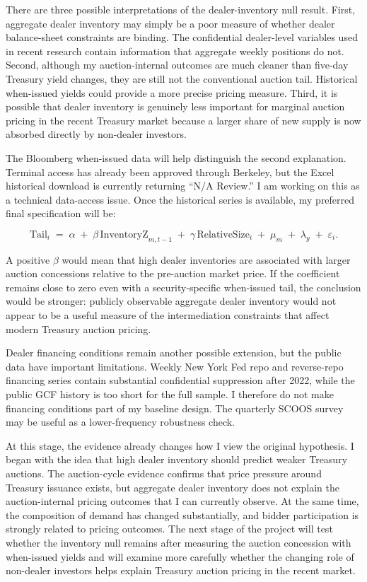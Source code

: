\documentclass[12pt]{article}
\begin{document}
There are three possible interpretations of the dealer-inventory null result. First, aggregate dealer inventory may simply be a poor measure of whether dealer balance-sheet constraints are binding. The confidential dealer-level variables used in recent research contain information that aggregate weekly positions do not. Second, although my auction-internal outcomes are much cleaner than five-day Treasury yield changes, they are still not the conventional auction tail. Historical when-issued yields could provide a more precise pricing measure. Third, it is possible that dealer inventory is genuinely less important for marginal auction pricing in the recent Treasury market because a larger share of new supply is now absorbed directly by non-dealer investors.

The Bloomberg when-issued data will help distinguish the second explanation. Terminal access has already been approved through Berkeley, but the Excel historical download is currently returning ``N/A Review.'' I am working on this as a technical data-access issue. Once the historical series is available, my preferred final specification will be:

\begin{equation*}
\text{Tail}_i \;=\; \alpha \;+\; \beta\,\text{InventoryZ}_{m,t-1} \;+\; \gamma\,\text{RelativeSize}_i \;+\; \mu_m \;+\; \lambda_y \;+\; \varepsilon_i .
\end{equation*}

A positive $\beta$ would mean that high dealer inventories are associated with larger auction concessions relative to the pre-auction market price. If the coefficient remains close to zero even with a security-specific when-issued tail, the conclusion would be stronger: publicly observable aggregate dealer inventory would not appear to be a useful measure of the intermediation constraints that affect modern Treasury auction pricing.

Dealer financing conditions remain another possible extension, but the public data have important limitations. Weekly New York Fed repo and reverse-repo financing series contain substantial confidential suppression after 2022, while the public GCF history is too short for the full sample. I therefore do not make financing conditions part of my baseline design. The quarterly SCOOS survey may be useful as a lower-frequency robustness check.

At this stage, the evidence already changes how I view the original hypothesis. I began with the idea that high dealer inventory should predict weaker Treasury auctions. The auction-cycle evidence confirms that price pressure around Treasury issuance exists, but aggregate dealer inventory does not explain the auction-internal pricing outcomes that I can currently observe. At the same time, the composition of demand has changed substantially, and bidder participation is strongly related to pricing outcomes. The next stage of the project will test whether the inventory null remains after measuring the auction concession with when-issued yields and will examine more carefully whether the changing role of non-dealer investors helps explain Treasury auction pricing in the recent market.
\end{document}
